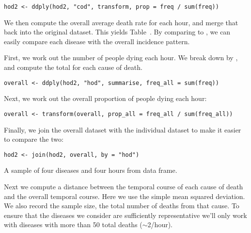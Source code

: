 \documentclass[article]{jss}
\begin{document}
\begin{Verbatim}
hod2 <- ddply(hod2, "cod", transform, prop = freq / sum(freq))
\end{Verbatim}

We then compute the overall average death rate for each hour, and merge that back into the original dataset. This yields Table~. By comparing  to , we can easily compare each disease with the overall incidence pattern.

First, we work out the number of people dying each hour.  We break down  by , and compute the total for each cause of death.

\begin{Verbatim}
overall <- ddply(hod2, "hod", summarise, freq_all = sum(freq))
\end{Verbatim}

Next, we work out the overall proportion of people dying each hour:

\begin{Verbatim}
overall <- transform(overall, prop_all = freq_all / sum(freq_all))
\end{Verbatim}

Finally, we join the overall dataset with the individual dataset to make it easier to compare the two:

\begin{Verbatim}
hod2 <- join(hod2, overall, by = "hod")
\end{Verbatim}

\begin{table}[htbp]
  \centering
  \subfloat[]{
    \label{tbl:counts:1}
  }%
  \subfloat[]{
    \label{tbl:counts:2}
  }%
  \subfloat[]{
    \label{tbl:counts:3}
  }%
  \subfloat[]{
    \label{tbl:counts:4}
  }
  
  \caption{A sample of four diseases and four hours from  data frame.}
  \label{tbl:counts}
\end{table}

Next we compute a distance between the temporal course of each cause of death and the overall temporal course. Here we use the simple mean squared deviation.  We also record the sample size, the total number of deaths from that cause. To ensure that the diseases we consider are sufficiently representative we'll only work with diseases with more than 50 total deaths ($\sim$2/hour).
\end{document}
